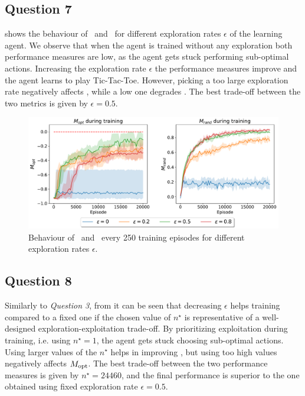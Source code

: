 \documentclass[10pt]{IEEEtran}
\begin{document}
\subsection*{Question 7}
 shows the behaviour of \mopt\ and \mrand\ for different exploration rates $\epsilon$ of the learning agent. We observe that when the agent is trained without any exploration both performance measures are low, as the agent gets stuck performing sub-optimal actions. Increasing the exploration rate $\epsilon$ the performance measures improve and the agent learns to play Tic-Tac-Toe. However, picking a too large exploration rate negatively affects \mopt, while a low one degrades \mrand. The best trade-off between the two metrics is given by $\epsilon = 0.5$.
\begin{figure}[h]
    \centering
    \includegraphics[width=\linewidth]{code/figures/performance_epsilon_self.pdf}
    \caption{Behaviour of \mopt\ and \mrand\ every 250 training episodes for different exploration rates $\epsilon$.}
    \label{plot_question7}
\end{figure}


\subsection*{Question 8}
Similarly to \emph{Question 3}, from  it can be seen that decreasing $\epsilon$ helps training compared to a fixed one if the chosen value of $n^{\star}$ is representative of a well-designed exploration-exploitation trade-off. By prioritizing exploitation during training, i.e. using $n^{\star} = 1$, the agent gets stuck choosing sub-optimal actions. Using larger values of the $n^{\star}$ helps in improving \mrand, but using too high values negatively affects $M_{\text{opt}}$. The best trade-off between the two performance measures is given by $n^{\star} = 24460$, and the final performance is superior to the one obtained using fixed exploration rate $\epsilon = 0.5$.  
\end{document}
